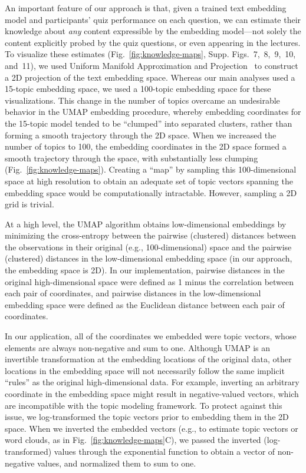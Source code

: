 \documentclass[10pt]{article}
\newcommand{\individualKnowledgeMapsA}{7}
\newcommand{\individualKnowledgeMapsB}{8}
\newcommand{\individualKnowledgeMapsC}{9}
\newcommand{\individualLearningMapsA}{10}
\newcommand{\individualLearningMapsB}{11}
\begin{document}
An important feature of our approach is that, given a trained text embedding
model and participants' quiz performance on each question, we can estimate
their knowledge about \textit{any} content expressible by the embedding
model---not solely the content explicitly probed by the quiz questions, or even
appearing in the lectures. To visualize these estimates
(Fig.~\ref{fig:knowledge-maps}, Supp.
Figs.~\individualKnowledgeMapsA,~\individualKnowledgeMapsB,~\individualKnowledgeMapsC,~\individualLearningMapsA,
and~\individualLearningMapsB), we used Uniform Manifold Approximation and
Projection~\citep[UMAP; ][]{McInEtal18a, McInEtal18b} to construct a 2D
projection of the text embedding space. Whereas our main analyses used a
15-topic embedding space, we used a 100-topic embedding space for these
visualizations. This change in the number of topics overcame an undesirable
behavior in the UMAP embedding procedure, whereby embedding coordinates for the
15-topic model tended to be ``clumped'' into separated clusters, rather than
forming a smooth trajectory through the 2D space. When we increased the number
of topics to 100, the embedding coordinates in the 2D space formed a smooth
trajectory through the space, with substantially less clumping
(Fig.~\ref{fig:knowledge-maps}). Creating a ``map'' by sampling this
100-dimensional space at high resolution to obtain an adequate set of topic
vectors spanning the embedding space would be computationally intractable.
However, sampling a 2D grid is trivial.

At a high level, the UMAP algorithm obtains low-dimensional embeddings by
minimizing the cross-entropy between the pairwise (clustered) distances between
the observations in their original (e.g., 100-dimensional) space and the
pairwise (clustered) distances in the low-dimensional embedding space (in our
approach, the embedding space is 2D). In our implementation, pairwise distances
in the original high-dimensional space were defined as 1 minus the correlation
between each pair of coordinates, and pairwise distances in the low-dimensional
embedding space were defined as the Euclidean distance between each pair of
coordinates.

In our application, all of the coordinates we embedded were topic vectors,
whose elements are always non-negative and sum to one. Although UMAP is an
invertible transformation at the embedding locations of the original data,
other locations in the embedding space will not necessarily follow the same
implicit ``rules'' as the original high-dimensional data. For example,
inverting an arbitrary coordinate in the embedding space might result in
negative-valued vectors, which are incompatible with the topic modeling
framework. To protect against this issue, we log-transformed the topic vectors
prior to embedding them in the 2D space. When we inverted the embedded vectors
(e.g., to estimate topic vectors or word clouds, as in
Fig.~\ref{fig:knowledge-maps}C), we passed the inverted (log-transformed)
values through the exponential function to obtain a vector of non-negative
values, and normalized them to sum to one.
\end{document}
